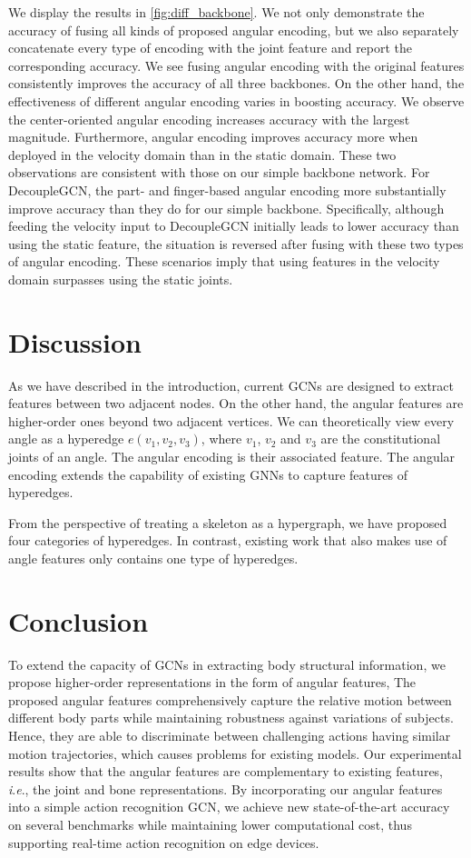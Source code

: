 \documentclass[journal,comsoc]{IEEEtran}
\newcommand{\ie}{\textit{i}.\textit{e}.,}
\begin{document}
We display the results in \autoref{fig:diff_backbone}. We not only demonstrate the accuracy of fusing all kinds of proposed angular encoding, but we also separately concatenate every type of encoding with the joint feature and report the corresponding accuracy. We see fusing angular encoding with the original features consistently improves the accuracy of all three backbones. On the other hand, the effectiveness of different angular encoding varies in boosting accuracy. We observe the center-oriented angular encoding increases accuracy with the largest magnitude. Furthermore, angular encoding improves accuracy more when deployed in the velocity domain than in the static domain. These two observations are consistent with those on our simple backbone network. For DecoupleGCN, the part- and finger-based angular encoding more substantially improve accuracy than they do for our simple backbone. Specifically, although feeding the velocity input to DecoupleGCN initially leads to lower accuracy than using the static feature, the situation is reversed after fusing with these two types of angular encoding. 
These scenarios imply that using features in the velocity domain surpasses using the static joints. 

    \section{Discussion}

As we have described in the introduction, current GCNs are designed to extract features between two adjacent nodes. On the other hand, the angular features are higher-order ones beyond two adjacent vertices. We can theoretically view every angle as a hyperedge $e(v_1, v_2, v_3)$, where $v_1$, $v_2$ and $v_3$ are the constitutional joints of an angle. The angular encoding is their associated feature. The angular encoding extends the capability of existing GNNs to capture features of hyperedges. 

From the perspective of treating a skeleton as a hypergraph, we have proposed four categories of hyperedges. In contrast, existing work that also makes use of angle features only contains one type of hyperedges.  \section{Conclusion}

To extend the capacity of GCNs in extracting body structural information, we propose higher-order representations in the form of angular features, 
The proposed angular features comprehensively capture the relative motion between different body parts while maintaining robustness against variations of subjects. Hence, they are able to
discriminate between challenging actions having similar motion trajectories, which causes problems for existing models. Our experimental results show that the angular features are complementary to existing features, \ie{} the joint and bone representations. By incorporating our angular features into a simple action recognition GCN, we achieve new state-of-the-art accuracy on several benchmarks while maintaining lower computational cost, thus supporting real-time action recognition on edge devices.
 


\end{document}
